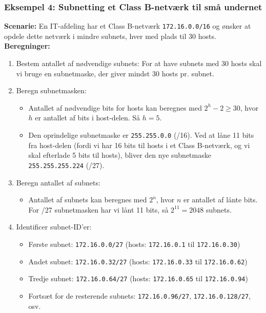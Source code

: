 \subsubsection{Eksempel 4: Subnetting et Class B-netværk til små undernet}
\textbf{Scenarie:} En IT-afdeling har et Class B-netværk \texttt{172.16.0.0/16} og ønsker at opdele dette netværk i mindre subnets, hver med plads til 30 hosts.
\newline\newline\noindent
\textbf{Beregninger:}
\begin{enumerate}
	\item Bestem antallet af nødvendige subnets: For at have subnets med 30 hosts skal vi bruge en subnetmaske, der giver mindst 30 hosts pr. subnet.
	\item Beregn subnetmasken:
	\begin{itemize}
		\item Antallet af nødvendige bits for hosts kan beregnes med \(2^h - 2 \geq 30\), hvor \(h\) er antallet af bits i host-delen. Så \(h = 5\).
		\item Den oprindelige subnetmaske er \texttt{255.255.0.0} (/16). Ved at låne 11 bits fra host-delen (fordi vi har 16 bits til hosts i et Class B-netværk, og vi skal efterlade 5 bits til hosts), bliver den nye subnetmaske \texttt{255.255.255.224} (/27).
	\end{itemize}
	\item Beregn antallet af subnets:
	\begin{itemize}
		\item Antallet af subnets kan beregnes med \(2^n\), hvor \(n\) er antallet af lånte bits. For /27 subnetmasken har vi lånt 11 bits, så \(2^{11} = 2048\) subnets.
	\end{itemize}
	\item Identificer subnet-ID'er:
	\begin{itemize}
		\item Første subnet: \texttt{172.16.0.0/27} (hosts: \texttt{172.16.0.1} til \texttt{172.16.0.30})
		\item Andet subnet: \texttt{172.16.0.32/27} (hosts: \texttt{172.16.0.33} til \texttt{172.16.0.62})
		\item Tredje subnet: \texttt{172.16.0.64/27} (hosts: \texttt{172.16.0.65} til \texttt{172.16.0.94})
		\item Fortsæt for de resterende subnets: \texttt{172.16.0.96/27}, \texttt{172.16.0.128/27}, osv.
	\end{itemize}
\end{enumerate}

